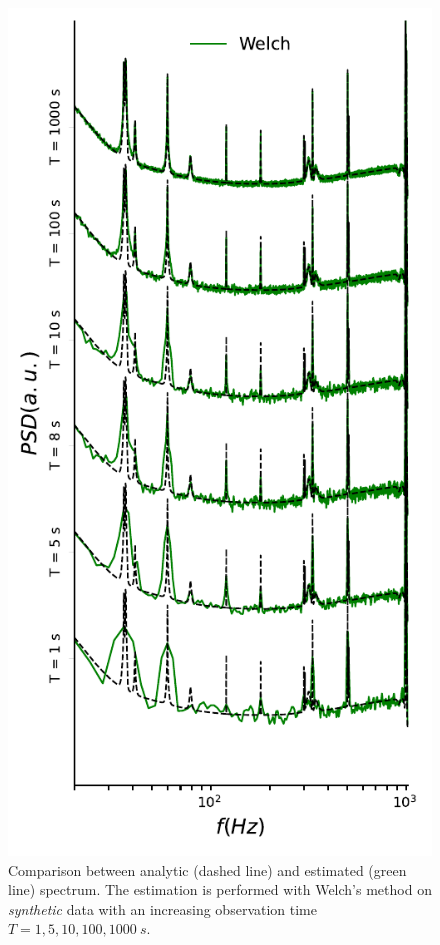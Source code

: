 \documentclass[epj,nopacs]{svjour}
\begin{document}
\begin{figure}
\begin{minipage}{0.99\columnwidth}
\end{minipage}\hfill
\begin{minipage}{0.99\columnwidth}
	\caption{Comparison between analytic (dashed line) and estimated (green line) spectrum. The estimation is performed with Welch's method on \textit{synthetic} data with an increasing observation time $T = 1, 5, 10, 100, \SI{1000}{s}$.}
	\label{fig:welch_LIGO_data}
	\includegraphics{Images/comparison_LVC_data/comparison_LVC_data_Welch.pdf}
\end{minipage}

\end{figure}
\end{document}
